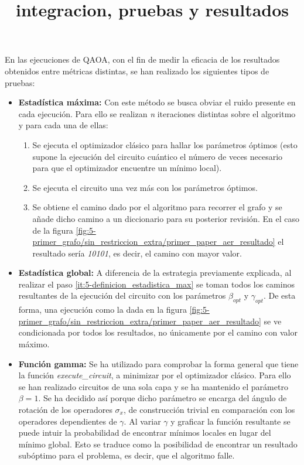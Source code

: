 \documentclass{article}
\title{integracion, pruebas y resultados}
\begin{document}
\maketitle{}
\tableofcontents{}

\newpage

En las ejecuciones de QAOA, con el fin de medir la eficacia de los resultados obtenidos entre métricas distintas, se han realizado los siguientes tipos de pruebas:
\begin{itemize}
\item \textbf{Estadística máxima:}
  Con este método se busca obviar el ruido presente en cada ejecución. Para ello se realizan \textit{n} iteraciones distintas sobre el algoritmo y para cada una de ellas:
  \begin{enumerate}
  \item
    Se ejecuta el optimizador clásico para hallar los parámetros óptimos (esto supone la ejecución del circuito cuántico el número de veces necesario para que el optimizador encuentre un mínimo local).
  \item
    Se ejecuta el circuito una vez más con los parámetros óptimos.
  \item \label{it:5-definicion_estadistica_max}
    Se obtiene el camino dado por el algoritmo para recorrer el grafo y se añade dicho camino a un diccionario para su posterior revisión. En el caso de la figura \ref{fig:5-primer_grafo/sin_restriccion_extra/primer_paper_aer_resultado}
    el resultado sería \textit{10101}, es decir, el camino con mayor valor.
  \end{enumerate}
  
\item \textbf{Estadística global:}
  A diferencia de la estrategia previamente explicada, al realizar el paso \ref{it:5-definicion_estadistica_max} se toman todos los caminos resultantes de la ejecución del circuito con los parámetros \(\beta_{opt}\) y \(\gamma_{opt}\).
  De esta forma, una ejecución como la dada en la figura \ref{fig:5-primer_grafo/sin_restriccion_extra/primer_paper_aer_resultado}
  se ve condicionada por todos los resultados, no únicamente por el camino con valor máximo.
  
\item \textbf{Función gamma:}
  Se ha utilizado para comprobar la forma general que tiene la función \textit{execute\_circuit}, a minimizar por el optimizador clásico. Para ello se han realizado circuitos de una sola capa y se ha mantenido el parámetro \(\beta=1\). Se ha decidido así porque dicho parámetro se encarga del ángulo de rotación de los operadores \(\sigma_{x}\), de construcción trivial en comparación con los operadores dependientes de \(\gamma\).
  Al variar \(\gamma\) y graficar la función resultante se puede intuir la probabilidad de encontrar mínimos locales en lugar del mínimo global. Esto se traduce como la posibilidad de encontrar un resultado subóptimo para el problema, es decir, que el algoritmo falle.
\end{itemize}
\end{document}
